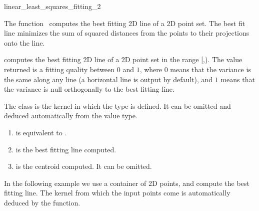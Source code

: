 
\begin{ccRefFunction}{linear_least_squares_fitting_2}  


\ccDefinition
  
The function \ccRefName\ computes the best fitting 2D line of a 2D
point set. The best fit line minimizes the sum of squared distances
from the points to their projections onto the line.


{ computes the best fitting 2D line of a 2D point set in the range
[,). The value returned is a fitting quality
between $0$ and $1$, where $0$ means that the variance is the same
along any line (a horizontal line is output by default), and $1$ means
that the variance is null orthogonally to the best fitting line. }

The class  is the kernel in which the type
 is defined. It can be omitted and
deduced automatically from the value type.


\begin{enumerate}
   \item  {} is equivalent to .
   \item  {} is the best fitting line computed.
   \item  {} is the centroid computed. 
          It can be omitted.
\end{enumerate}

\ccExample


In the following example we use a \stl container of 2D points, and
compute the best fitting line. The kernel from which the input points
come is automatically deduced by the function.


\end{ccRefFunction}
